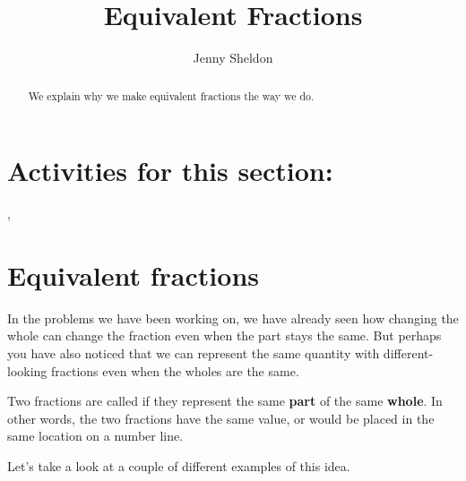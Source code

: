 \documentclass{ximera}
\title{Equivalent Fractions}
\author{Jenny Sheldon}
\begin{document}
\begin{abstract}
We explain why we make equivalent fractions the way we do.
\end{abstract}
\maketitle

\section{Activities for this section:}  
, 


\section{Equivalent fractions}

In the problems we have been working on, we have already seen how changing the whole can change the fraction even when the part stays the same. But perhaps you have also noticed that we can represent the same quantity with different-looking fractions even when the wholes are the same.

\begin{definition}
Two fractions are called  if they represent the same {\bf part} of the same {\bf whole}. In other words, the two fractions have the same value, or would be placed in the same location on a number line.
\end{definition}

Let's take a look at a couple of different examples of this idea.
\end{document}

